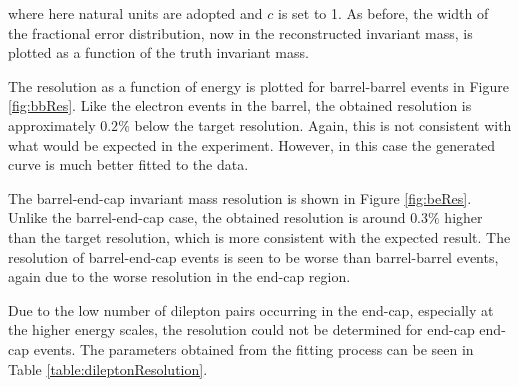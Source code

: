 \documentclass{article}
\begin{document}
where here natural units are adopted and $c$ is set to 1. As before, the width of the fractional error distribution, now in the reconstructed invariant mass, is plotted as a function of the truth invariant mass.

The resolution as a function of energy is plotted for barrel-barrel events in Figure \ref{fig:bbRes}.  Like the electron events in the barrel, the obtained resolution is approximately $0.2\%$ below the target resolution. Again, this is not consistent with what would be expected in the experiment. However, in this case the generated curve is much better fitted to the data.

The barrel-end-cap invariant mass resolution is shown in Figure \ref{fig:beRes}. Unlike the barrel-end-cap case, the obtained resolution is around $0.3\%$ higher than the target resolution, which is more consistent with the expected result. The resolution of barrel-end-cap events is seen to be worse than barrel-barrel events, again due to the worse resolution in the end-cap region.

Due to the low number of dilepton pairs occurring in the end-cap, especially at the higher energy scales, the resolution could not be determined for end-cap end-cap events. The parameters obtained from the fitting process can be seen in Table \ref{table:dileptonResolution}.
\end{document}
